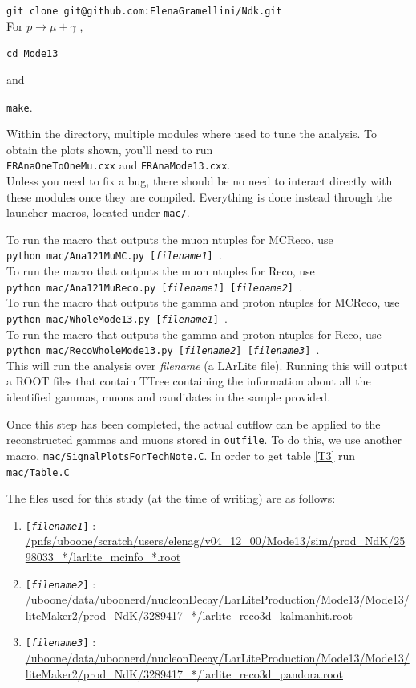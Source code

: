 \documentclass[a4paper, 10pt]{article}
\begin{document}
\texttt{git clone git@github.com:ElenaGramellini/Ndk.git} \\




\noindent
For $p \rightarrow \mu{+} \gamma$ , 

\texttt{cd Mode13}

\noindent
and

\texttt{make}.

Within the directory, multiple modules where used to tune the analysis. To obtain the plots shown, you'll need to run\\
 \texttt{ERAnaOneToOneMu.cxx} and \texttt{ERAnaMode13.cxx}. \\
Unless you need to fix a bug, there should be no need to interact directly with these modules once they are compiled. Everything is done instead through the launcher macros,  located under \texttt{mac/}.

To run the macro that outputs the muon ntuples for MCReco, use\\
\texttt{python mac/Ana121MuMC.py [\textit{filename1}] }.\\
To run the macro that outputs the muon ntuples for Reco, use\\
\texttt{python mac/Ana121MuReco.py [\textit{filename1}] [\textit{filename2}]  }.\\

To run the macro that outputs the gamma and proton ntuples for MCReco, use\\
\texttt{python mac/WholeMode13.py [\textit{filename1}] }.\\
To run the macro that outputs the gamma and proton ntuples for Reco, use\\
\texttt{python mac/RecoWholeMode13.py [\textit{filename2}] [\textit{filename3}]  }.\\


\noindent
This will run the analysis over \textit{filename} (a LArLite file). Running this will output a ROOT files that contain TTree containing the information about all the identified gammas, muons and candidates in the sample provided.

Once this step has been completed, the actual cutflow can be applied to the reconstructed  gammas and muons stored in \texttt{outfile}. To do this, we use another macro, \texttt{mac/SignalPlotsForTechNote.C}. In order to get table \ref{T3} run \texttt{mac/Table.C}


The files used for this study (at the time of writing) are as follows:
\begin{enumerate}[topsep=10pt,itemsep=-1ex,partopsep=10pt,parsep=1ex]
\item []\texttt{[\textit{filename1}]} : \url{/pnfs/uboone/scratch/users/elenag/v04_12_00/Mode13/sim/prod_NdK/2598033_*/larlite_mcinfo_*.root}
\item []\texttt{[\textit{filename2}]} : \url{/uboone/data/uboonerd/nucleonDecay/LarLiteProduction/Mode13/Mode13/liteMaker2/prod_NdK/3289417_*/larlite_reco3d_kalmanhit.root}
\item []\texttt{[\textit{filename3}]} : \url{/uboone/data/uboonerd/nucleonDecay/LarLiteProduction/Mode13/Mode13/liteMaker2/prod_NdK/3289417_*/larlite_reco3d_pandora.root}
\end{enumerate}
\end{document}
